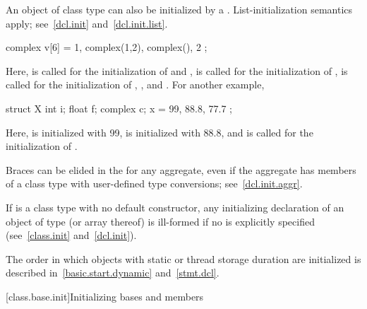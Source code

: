 \pnum
{}%
%
An object of class type can also be initialized by a
. List-initialization semantics apply;
see~\ref{dcl.init} and~\ref{dcl.init.list}.
\begin{example}
\begin{codeblock}
complex v[6] = { 1, complex(1,2), complex(), 2 };
\end{codeblock}

Here,
is called for the initialization of
and
,
is called for the initialization of
,
is called for the initialization of
,
,
and
.
For another example,

\begin{codeblock}
struct X {
  int i;
  float f;
  complex c;
} x = { 99, 88.8, 77.7 };
\end{codeblock}

Here,
is initialized with 99,
is initialized with 88.8, and
is called for the initialization of
.
\end{example}
\begin{note}
Braces can be elided in the
for any aggregate, even if the aggregate has members of a class type with
user-defined type conversions; see~\ref{dcl.init.aggr}.
\end{note}

\pnum
\begin{note}
If
is a class type with no default constructor,
any initializing declaration of an object of type
(or array thereof) is ill-formed if no
is explicitly specified (see~\ref{class.init} and~\ref{dcl.init}).
\end{note}

\pnum
\begin{note}
%
The order in which objects with static or thread storage duration
are initialized is described in~\ref{basic.start.dynamic} and~\ref{stmt.dcl}.
\end{note}

[class.base.init]{Initializing bases and members}%
%


